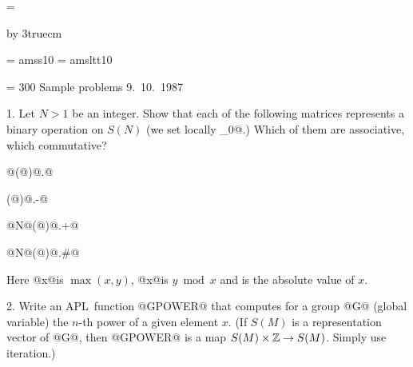 

\magnification = 

\advance\vsize by 3truecm





\font\sans = amss10
\font\sltt = amsltt10

\def\header{{\sans  Sample problems  9.\ 10.\ 1987}}
\def\APL{{\sltt APL}}

\nopagenumbers
\tolerance = 300
\noindent
\header

\vskip 2cm

\item{1.} Let $N>1$ be an integer. Show that each of the following
          matrices represents a binary operation on
          $S(N)$ (we set locally \BX@IO_0@.) Which of them are
          associative, which commutative?
          \medskip

           @(@\IO@N)@\SO@.@\CE\IO@N@

           \AB@(@\IO@N)@\SO@.-@\IO@N@

           @N@\AB@(@\IO@N)@\SO@.+@\IO@N@

           @N@\AB@(@\IO@N)@\SO@.#@\IO@N@

           \medskip
\item{}    Here @x@\CE@y@ is $\max(x,y)$, @x@\AB@y@ is
           $y\bmod x$ and \AB@x@ is the absolute value of $x$.

\bigskip

\item{2.} Write an \APL\ function @GPOWER@ that computes for a group
          @G@ (global variable) the $n$-th power of a given element $x$.
          (If $S(M)$ is a representation vector of @G@, then
          @GPOWER@ is a map $S(M)\times \Bbb Z\to S(M)$. Simply
          use iteration.)

